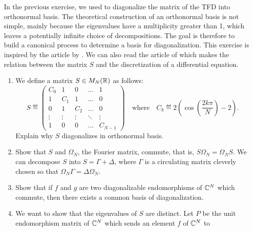  
\begin{exo}
\label{exo-diagonalization-tfd}
 
   In the previous exercise, we used \Matlab{} to diagonalize the matrix of the TFD into orthonormal basis. The theoretical construction of an orthonormal basis is not simple, mainly because the eigenvalues have a multiplicity greater than 1, which leaves a potentially infinite choice of decompositions. The goal is therefore to build a canonical process to determine a basis for diagonalization. This exercise is inspired by the article by . We can also read the article of  which makes the relation between the matrix $ S $ and the discretization of a differential equation. \begin{enumerate}
\item \label{notation-50} \label{notation-51} We define a matrix $ S \in M_N (\mathbb{R}) $ as follows:
\begin{equation*}
S \eqdef \begin{pmatrix} C_0 & 1 & 0 & \ldots & 1 \\1 & C_1 & 1 & \ldots & 0 \\0 & 1 & C_2 & \ldots & 0 \\\vdots & \vdots & \vdots & \ddots & \vdots \\1 & 0 & 0 & \ldots & C_{N-1} \end{pmatrix} \quad \text{where} \quad C_k \eqdef 2 \left(\cos \left(\frac{2k \pi}{N} \right) - 2 \right).
\end{equation*}
Explain why $ S $ diagonalizes in orthonormal basis.
\item {} Show that $ S $ and $ \Omega_N $, the Fourier matrix, commute, that is, $ S \Omega_N = \Omega_N S $. We can decompose $ S $ into $ S = \Gamma + \Delta $, where $ \Gamma $ is a circulating matrix cleverly chosen so that $ \Omega_N \Gamma = \Delta \Omega_N $.
\item Show that if $ f $ and $ g $ are two diagonalizable endomorphisms of $ \mathbb{C}^N $ which commute, then there exists a common basis of diagonalization.
\item {}  We want to show that the eigenvalues of $ S $ are distinct. Let $ P $ be the unit endomorphism matrix of $ \mathbb{C}^N $ which sends an element $ f $ of $ \mathbb{C}^N $ to
\begin{align*}

\end{align*}
\end{enumerate}
\end{exo}

